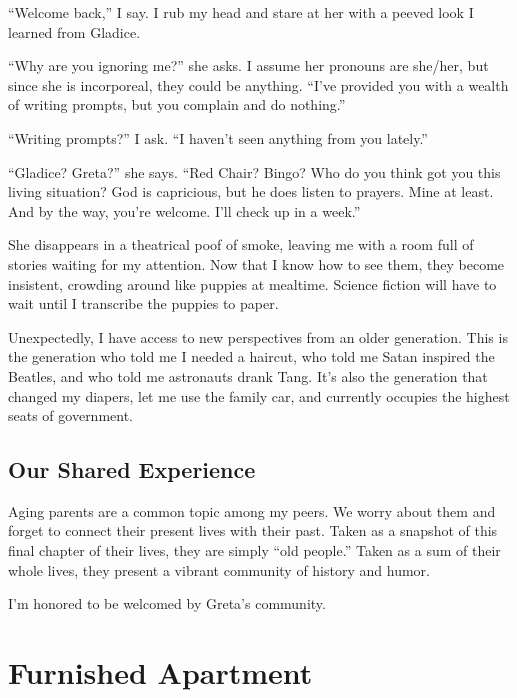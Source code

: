 \documentclass[
  letterpaper,
  DIV=11,
  numbers=noendperiod]{scrreprt}
\begin{document}
``Welcome back,'' I say. I rub my head and stare at her with a peeved
look I learned from Gladice.

``Why are you ignoring me?'' she asks. I assume her pronouns are
she/her, but since she is incorporeal, they could be anything. ``I've
provided you with a wealth of writing prompts, but you complain and do
nothing.''

``Writing prompts?'' I ask. ``I haven't seen anything from you lately.''

``Gladice? Greta?'' she says. ``Red Chair? Bingo? Who do you think got
you this living situation? God is capricious, but he does listen to
prayers. Mine at least. And by the way, you're welcome. I'll check up in
a week.''

She disappears in a theatrical poof of smoke, leaving me with a room
full of stories waiting for my attention. Now that I know how to see
them, they become insistent, crowding around like puppies at mealtime.
Science fiction will have to wait until I transcribe the puppies to
paper.

Unexpectedly, I have access to new perspectives from an older
generation. This is the generation who told me I needed a haircut, who
told me Satan inspired the Beatles, and who told me astronauts drank
Tang. It's also the generation that changed my diapers, let me use the
family car, and currently occupies the highest seats of government.

\section*{Our Shared Experience}\label{our-shared-experience}


Aging parents are a common topic among my peers. We worry about them and
forget to connect their present lives with their past. Taken as a
snapshot of this final chapter of their lives, they are simply ``old
people.'' Taken as a sum of their whole lives, they present a vibrant
community of history and humor.

I'm honored to be welcomed by Greta's community.


\chapter*{Furnished Apartment}\label{furnished-apartment}
\end{document}
